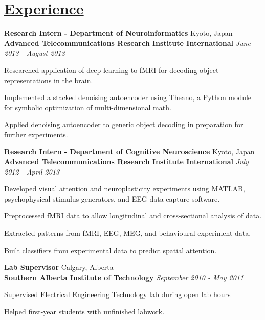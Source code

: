 \documentclass[a4paper, 11pt]{article}
\begin{document}
\section{\underline{Experience}}
  \textbf{Research Intern - Department of Neuroinformatics}
  \hfill
  Kyoto, Japan \\
  \textbf{Advanced Telecommunications Research Institute International}
  \hfill
  \emph{June 2013 - August 2013}
  \begin{itemize*}
    \item Researched application of deep learning to fMRI for decoding object representations in the brain.
    \item Implemented a stacked denoising autoencoder using Theano, a Python module for symbolic optimization of multi-dimensional math.
    \item Applied denoising autoencoder to generic object decoding in preparation for further experiments.
  \end{itemize*}
  \textbf{Research Intern - Department of Cognitive Neuroscience}
  \hfill
  Kyoto, Japan\\
  \textbf{Advanced Telecommunications Research Institute International}
  \hfill
  \emph{July 2012 - April 2013}
  \begin{itemize*}
    \item Developed visual attention and neuroplasticity experiments using MATLAB, psychophysical stimulus generators, and EEG data capture software.
    \item Preprocessed fMRI data to allow longitudinal and cross-sectional analysis of data.
    \item Extracted patterns from fMRI, EEG, MEG, and behavioural experiment data.
    \item Built classifiers from experimental data to predict spatial attention.
  \end{itemize*}
  \textbf{Lab Supervisor}
  \hfill
  Calgary, Alberta\\
  \textbf{Southern Alberta Institute of Technology}
  \hfill
  \emph{September 2010 - May 2011}
  \begin{itemize*}
    \item Supervised Electrical Engineering Technology lab during open lab hours
    \item Helped first-year students with unfinished labwork.
  \end{itemize*}


\end{document}
